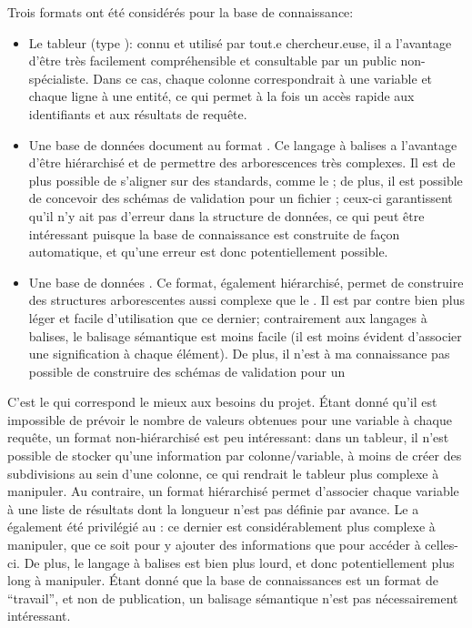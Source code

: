 Trois formats ont été considérés pour la base de connaissance:
\begin{itemize}
	\item Le tableur (type \tsv{}): connu et utilisé par tout.e chercheur.euse, il a l'avantage d'être très facilement compréhensible et consultable par un public non-spécialiste. Dans ce cas, chaque colonne correspondrait à une variable et chaque ligne à une entité, ce qui permet à la fois un accès rapide aux identifiants et aux résultats de requête.
	\item Une base de données document au format \xml{}. Ce langage à balises a l'avantage d'être hiérarchisé et de permettre des arborescences très complexes. Il est de plus possible de s'aligner sur des standards, comme le \xmltei{}; de plus, il est possible de concevoir des schémas de validation pour un fichier \xml{}; ceux-ci garantissent qu'il n'y ait pas d'erreur dans la structure de données, ce qui peut être intéressant puisque la base de connaissance est construite de façon automatique, et qu'une erreur est donc potentiellement possible.
	\item Une base de données \json{}. Ce format, également hiérarchisé, permet de construire des structures arborescentes aussi complexe que le \xml{}. Il est par contre bien plus léger et facile d'utilisation que ce dernier; contrairement aux langages à balises, le balisage sémantique est moins facile (il est moins évident d'associer une signification à chaque élément). De plus, il n'est à ma connaissance pas possible de construire des schémas de validation pour un \json{}
\end{itemize}

C'est le \json{} qui correspond le mieux aux besoins du projet. Étant donné qu'il est impossible de prévoir le nombre de valeurs obtenues pour une variable à chaque requête, un format non-hiérarchisé est peu intéressant: dans un tableur, il n'est possible de stocker qu'une information par colonne/variable, à moins de créer des subdivisions au sein d'une colonne, ce qui rendrait le tableur plus complexe à manipuler. Au contraire, un format hiérarchisé permet d'associer chaque variable à une liste de résultats dont la longueur n'est pas définie par avance. Le \json{} a également été privilégié au \xml{}: ce dernier est considérablement plus complexe à manipuler, que ce soit pour y ajouter des informations que pour accéder à celles-ci. De plus, le langage à balises est bien plus lourd, et donc potentiellement plus long à manipuler. Étant donné que la base de connaissances est un format de \enquote{travail}, et non de publication, un balisage sémantique n'est pas nécessairement intéressant.

